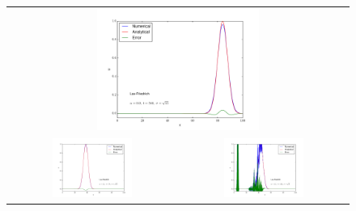 \documentclass[11pt,letterpaper]{article}
\begin{document}
\begin{figure}[bth]
\centering
\begin{tabular}{cc}
    \multicolumn{2}{c}{ 
    	\includegraphics[width={0.49\textwidth}]{fig6.pdf}
    } \\
    \includegraphics[width={0.49\textwidth}]{fig7.pdf} &
    \includegraphics[width={0.49\textwidth}]{fig8.pdf} \\

\end{tabular}
\end{figure}
\end{document}
